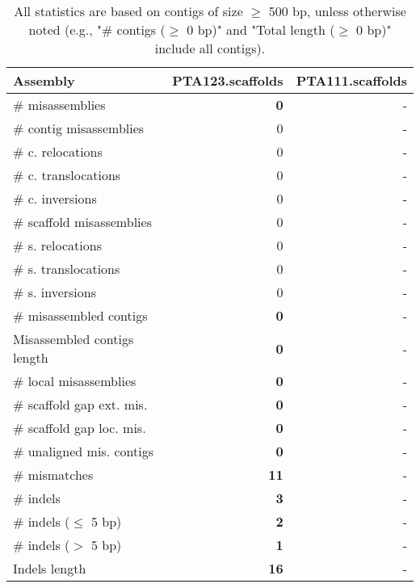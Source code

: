 \documentclass[12pt,a4paper]{article}
\begin{document}
\begin{table}[ht]
\begin{center}
\caption{All statistics are based on contigs of size $\geq$ 500 bp, unless otherwise noted (e.g., "\# contigs ($\geq$ 0 bp)" and "Total length ($\geq$ 0 bp)" include all contigs).}
\begin{tabular}{|l*{2}{|r}|}
\hline
Assembly & PTA123.scaffolds & PTA111.scaffolds \\ \hline
\# misassemblies & {\bf 0} & - \\ \hline
\hspace{2mm}\# contig misassemblies & 0 & - \\ \hline
\hspace{5mm}\# c. relocations & 0 & - \\ \hline
\hspace{5mm}\# c. translocations & 0 & - \\ \hline
\hspace{5mm}\# c. inversions & 0 & - \\ \hline
\hspace{2mm}\# scaffold misassemblies & 0 & - \\ \hline
\hspace{5mm}\# s. relocations & 0 & - \\ \hline
\hspace{5mm}\# s. translocations & 0 & - \\ \hline
\hspace{5mm}\# s. inversions & 0 & - \\ \hline
\# misassembled contigs & {\bf 0} & - \\ \hline
Misassembled contigs length & {\bf 0} & - \\ \hline
\# local misassemblies & {\bf 0} & - \\ \hline
\# scaffold gap ext. mis. & {\bf 0} & - \\ \hline
\# scaffold gap loc. mis. & {\bf 0} & - \\ \hline
\# unaligned mis. contigs & {\bf 0} & - \\ \hline
\# mismatches & {\bf 11} & - \\ \hline
\# indels & {\bf 3} & - \\ \hline
\hspace{5mm}\# indels ($\leq$ 5 bp) & {\bf 2} & - \\ \hline
\hspace{5mm}\# indels ($>$ 5 bp) & {\bf 1} & - \\ \hline
Indels length & {\bf 16} & - \\ \hline
\end{tabular}
\end{center}
\end{table}
\end{document}
